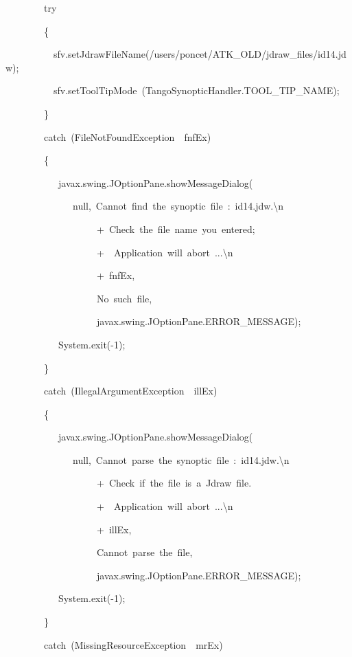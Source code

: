 \begin{lyxcode}
~~~~~~~~try

~~~~~~~~\{~~~~~

~~~~~~~~~~sfv.setJdrawFileName(\textquotedbl{}/users/poncet/ATK\_OLD/jdraw\_files/id14.jdw\textquotedbl{});

~~~~~~~~~~sfv.setToolTipMode~(TangoSynopticHandler.TOOL\_TIP\_NAME);

~~~~~~~~\}

~~~~~~~~catch~(FileNotFoundException~~fnfEx)

~~~~~~~~\{

~~~~~~~~~~~javax.swing.JOptionPane.showMessageDialog(

~~~~~~~~~~~~~~null,~\textquotedbl{}Cannot~find~the~synoptic~file~:~id14.jdw.\textbackslash{}n\textquotedbl{}

~~~~~~~~~~~~~~~~~~~+~\textquotedbl{}Check~the~file~name~you~entered;\textquotedbl{}

~~~~~~~~~~~~~~~~~~~+~\textquotedbl{}~Application~will~abort~...\textbackslash{}n\textquotedbl{}

~~~~~~~~~~~~~~~~~~~+~fnfEx,

~~~~~~~~~~~~~~~~~~~\textquotedbl{}No~such~file\textquotedbl{},

~~~~~~~~~~~~~~~~~~~javax.swing.JOptionPane.ERROR\_MESSAGE);

~~~~~~~~~~~System.exit(-1);

~~~~~~~~\}

~~~~~~~~catch~(IllegalArgumentException~~illEx)

~~~~~~~~\{

~~~~~~~~~~~javax.swing.JOptionPane.showMessageDialog(

~~~~~~~~~~~~~~null,~\textquotedbl{}Cannot~parse~the~synoptic~file~:~id14.jdw.\textbackslash{}n\textquotedbl{}

~~~~~~~~~~~~~~~~~~~+~\textquotedbl{}Check~if~the~file~is~a~Jdraw~file.\textquotedbl{}

~~~~~~~~~~~~~~~~~~~+~\textquotedbl{}~Application~will~abort~...\textbackslash{}n\textquotedbl{}

~~~~~~~~~~~~~~~~~~~+~illEx,

~~~~~~~~~~~~~~~~~~~\textquotedbl{}Cannot~parse~the~file\textquotedbl{},

~~~~~~~~~~~~~~~~~~~javax.swing.JOptionPane.ERROR\_MESSAGE);

~~~~~~~~~~~System.exit(-1);

~~~~~~~~\}

~~~~~~~~catch~(MissingResourceException~~mrEx)


\end{lyxcode}
